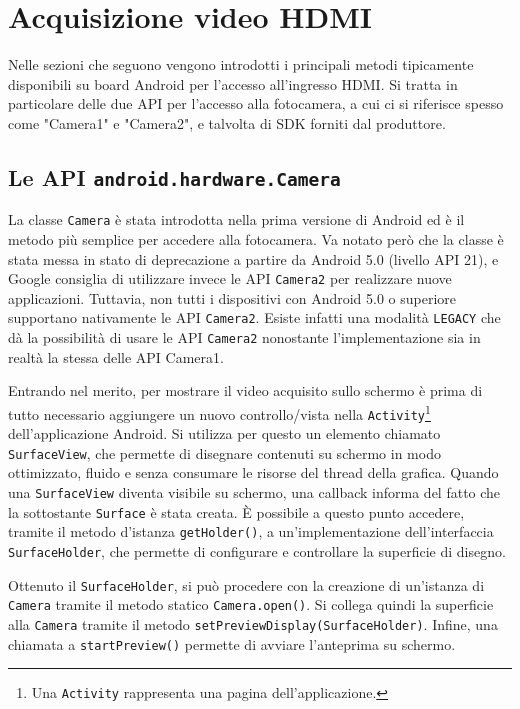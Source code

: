 \chapter{Acquisizione video HDMI}
\label{cha:hdmi}

Nelle sezioni che seguono vengono introdotti i principali metodi tipicamente disponibili su board Android per l'accesso all'ingresso HDMI. Si tratta in particolare delle due API per l'accesso alla fotocamera, a cui ci si riferisce spesso come "Camera1" e "Camera2", e talvolta di SDK forniti dal produttore.


\section{Le API \texttt{android.hardware.Camera}}
\label{sec:hdmi_camera1}

La classe \texttt{Camera} è stata introdotta nella prima versione di Android ed è il metodo più semplice per accedere alla fotocamera. Va notato però che la classe è stata messa in stato di deprecazione a partire da Android 5.0 (livello API 21), e Google consiglia di utilizzare invece le API \texttt{Camera2} per realizzare nuove applicazioni.\footnotemark{} Tuttavia, non tutti i dispositivi con Android 5.0 o superiore supportano nativamente le API \texttt{Camera2}. Esiste infatti una modalità \texttt{LEGACY} che dà la possibilità di usare le API \texttt{Camera2} nonostante l'implementazione sia in realtà la stessa delle API Camera1.


Entrando nel merito, per mostrare il video acquisito sullo schermo è prima di tutto necessario aggiungere un nuovo controllo/vista nella \texttt{Activity}\footnote{Una \texttt{Activity} rappresenta una pagina dell'applicazione.} dell'applicazione Android. Si utilizza per questo un elemento chiamato \texttt{SurfaceView}, che permette di disegnare contenuti su schermo in modo ottimizzato, fluido e senza consumare le risorse del thread della grafica. Quando una \texttt{SurfaceView} diventa visibile su schermo, una callback informa del fatto che la sottostante \texttt{Surface} è stata creata. È possibile a questo punto accedere, tramite il metodo d'istanza \texttt{getHolder()}, a un'implementazione dell'interfaccia \texttt{SurfaceHolder}, che permette di configurare e controllare la superficie di disegno.

Ottenuto il \texttt{SurfaceHolder}, si può procedere con la creazione di un'istanza di \texttt{Camera} tramite il metodo statico \texttt{Camera.open()}. Si collega quindi la superficie alla \texttt{Camera} tramite il metodo \texttt{setPreviewDisplay(SurfaceHolder)}. Infine, una chiamata a \texttt{startPreview()} permette di avviare l'anteprima su schermo.

